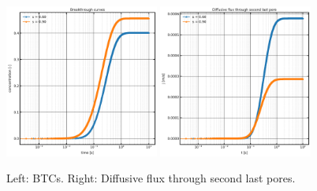 \documentclass{article}
\begin{document}
\begin{figure}[htbp!]
    \centering
    \includegraphics[width=0.45\textwidth]{images/fromOpenPNM/BTCsVsVar.png}
    \hspace{0.05\textwidth}
    \includegraphics[width=0.45\textwidth]{images/fromOpenPNM/diffFluxVsVar.png}
    \caption{Left: BTCs. Right: Diffusive flux through second last pores.}
    \label{fig:BTCandDiffFlux}
\end{figure}

\FloatBarrier  %
\end{document}
